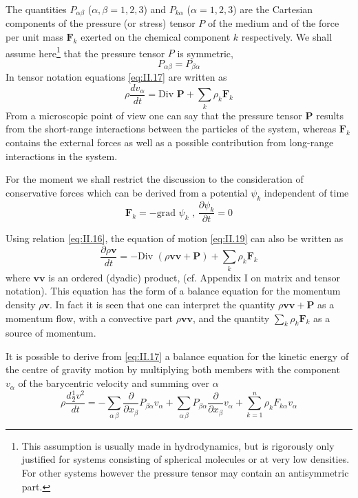 The quantities $P_{\alpha \beta}$ ($\alpha, \beta = 1,2,3$) and $P_{k \alpha}$ ($\alpha = 1,2,3$) are the Cartesian components of the pressure (or stress) tensor $P$ of the medium and of the force per unit mass $\bm{F}_k$ exerted on the chemical component $k$ respectively.
We shall assume here\footnote{This assumption is usually made in hydrodynamics, but is rigorously only justified for systems consisting of spherical molecules or at very low densities. For other systems however the pressure tensor may contain an antisymmetric part.} that the pressure tensor $P$ is symmetric,
\begin{equation}
P_{ \alpha \beta} = P_{\beta \alpha}
    \label{eq:II.18}
\end{equation}
In tensor notation equations \eqref{eq:II.17} are written as
\begin{equation}
\rho \frac{d v_{\alpha}}{d t} = \textrm{Div } \bm{P} + \sum_k \rho_k \bm{F}_k
    \label{eq:II.19}
\end{equation}
From a microscopic point of view one can say that the pressure tensor $\bm{P}$ results from the short-range interactions between the particles of the system, whereas $\bm{F}_k$ contains the external forces as well as a possible contribution from long-range interactions in the system.

For the moment we shall restrict the discussion to the consideration
of conservative forces which can be derived from a potential $\psi_k$ independent
of time
\begin{equation}
\bm{F}_k = - \textrm{grad } \psi_k \textrm{ ,   } \frac{\partial \psi_k}{\partial t} = 0
    \label{eq:II.20}
\end{equation}

Using relation \eqref{eq:II.16}, the equation of motion \eqref{eq:II.19} can also be written as
\begin{equation}
\frac{\partial \rho \bm{v}}{d t} = - \textrm{Div } \left(\rho \bm{v} \bm{v} + \bm{P} \right) + \sum_k \rho_k \bm{F}_k
    \label{eq:II.21}
\end{equation}
where $\bm{v} \bm{v}$ is an ordered (dyadic) product, (cf. Appendix I on matrix and tensor notation). This equation has the form of a balance equation for the momentum density $\rho \bm{v}$. In fact it is seen that one can interpret the quantity $\rho \bm{v} \bm{v} + \bm{P}$ as a momentum flow, with a convective part $\rho \bm{v} \bm{v}$, and the quantity $\sum_k \rho_k \bm{F}_k$ as a source of momentum.

It is possible to derive from \eqref{eq:II.17} a balance equation for the kinetic energy of the centre of gravity motion by multiplying both members with the component $v_{\alpha}$ of the barycentric velocity and summing over ${\alpha}$
\begin{equation}
\rho \frac{d \frac{1}{2} v^2}{d t} = - \sum_{\alpha\,\beta} \frac{\partial}{\partial x_{\beta}} P_{\beta \alpha} v_{\alpha} 
+
\sum_{\alpha\,\beta} P_{\beta \alpha} \frac{\partial}{\partial x_{\beta}} v_{\alpha}
+ 
\sum_{k=1}^{n} \rho_k F_{k \alpha} v_{\alpha}
    \label{eq:II.22}
\end{equation}

